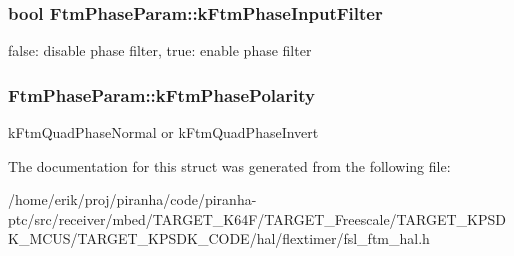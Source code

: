 \subsubsection[{\texorpdfstring{k\+Ftm\+Phase\+Input\+Filter}{kFtmPhaseInputFilter}}]{\setlength{\rightskip}{0pt plus 5cm}bool Ftm\+Phase\+Param\+::k\+Ftm\+Phase\+Input\+Filter}\hypertarget{structFtmPhaseParam_a4dbd9e4f63b8d40055aa1c0348df1d11}{}\label{structFtmPhaseParam_a4dbd9e4f63b8d40055aa1c0348df1d11}
false\+: disable phase filter, true\+: enable phase filter 
\subsubsection[{\texorpdfstring{k\+Ftm\+Phase\+Polarity}{kFtmPhasePolarity}}]{ Ftm\+Phase\+Param\+::k\+Ftm\+Phase\+Polarity}\hypertarget{structFtmPhaseParam_a3b51ac5a871a3ab51f3e9071288394df}{}\label{structFtmPhaseParam_a3b51ac5a871a3ab51f3e9071288394df}
k\+Ftm\+Quad\+Phase\+Normal or k\+Ftm\+Quad\+Phase\+Invert 

The documentation for this struct was generated from the following file\+:\begin{DoxyCompactItemize}
\item 
/home/erik/proj/piranha/code/piranha-\/ptc/src/receiver/mbed/\+T\+A\+R\+G\+E\+T\+\_\+\+K64\+F/\+T\+A\+R\+G\+E\+T\+\_\+\+Freescale/\+T\+A\+R\+G\+E\+T\+\_\+\+K\+P\+S\+D\+K\+\_\+\+M\+C\+U\+S/\+T\+A\+R\+G\+E\+T\+\_\+\+K\+P\+S\+D\+K\+\_\+\+C\+O\+D\+E/hal/flextimer/fsl\+\_\+ftm\+\_\+hal.\+h\end{DoxyCompactItemize}
